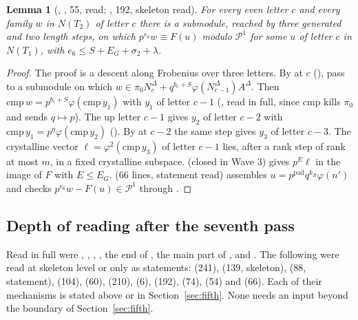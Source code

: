 \documentclass[11pt]{article}
\newcommand{\NN}{N^{\Delta}}
\newcommand{\Pp}{\mathcal P}
\newtheorem{lemma}{Lemma}
\theoremstyle{definition}
\theoremstyle{remark}
\begin{document}
\begin{lemma}[, , 55, read; , 192, skeleton read]
For every even letter $c$ and every family $w$ in $N(T_2)$ of letter $c$ there is a submodule, reached by three generated and two length steps, on which $p^{e_6}w\equiv F(u)$ modulo $\Pp^1$ for some $u$ of letter $c$ in $N(T_1)$, with $e_6\le S+E_G+\sigma_2+\lambda$.
\end{lemma}

\begin{proof}
The proof is a descent along Frobenius over three letters. By  at $c$ (), pass to a submodule on which $w\in\pi_0\NN_c+q^{b_c+S}\varphi(\NN_{c-1})A^\Delta$. Then $\mathrm{cmp}\,w=p^{b_c+S}\varphi(\mathrm{cmp}\,y_1)$ with $y_1$ of letter $c-1$ (, read in full, since $\mathrm{cmp}$ kills $\pi_0$ and sends $q\mapsto p$). The up letter $c-1$ gives $y_2$ of letter $c-2$ with $\mathrm{cmp}\,y_1=p^\eta\varphi(\mathrm{cmp}\,y_2)$ (). By  at $c-2$ the same step gives $y_3$ of letter $c-3$. The crystalline vector $\ell=\varphi^2(\mathrm{cmp}\,y_3)$ of letter $c-1$ lies, after a rank step of rank at most $m$, in a fixed crystalline subspace.  (closed in Wave 3) gives $p^E\ell$ in the image of $F$ with $E\le E_G$.  (66 lines, statement read) assembles $u=p^{\mathrm{pad}}q^{k_B}\varphi(n')$ and checks $p^{e_6}w-F(u)\in\Pp^1$ through .
\end{proof}

\subsection*{Depth of reading after the seventh pass}

Read in full were , , , , the end of , the main part of ,  and . The following were read at skeleton level or only as statements:  (241),  (139, skeleton),  (88, statement),  (104),  (60),  (210),  (6),  (192),  (74),  (54) and  (66). Each of their mechanisms is stated above or in Section~\ref{sec:fifth}. None needs an input beyond the boundary of Section~\ref{sec:fifth}.
\end{document}
